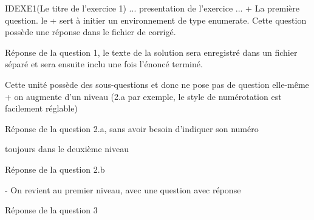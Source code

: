 \documentclass[11pt,report,oneside,solution]{cpgedev}
\begin{document}
\begin{latex}[]
\begin{exercice}{IDEXE1}(Le titre de l'exercice 1)
     ... presentation de l'exercice ...
\xques+ La première question. le + sert à initier un environnement de type enumerate. Cette question possède une réponse dans le fichier de corrigé.
\begin{solution}
     Réponse de la question 1, le texte de la solution sera enregistré dans un fichier séparé et sera ensuite inclu une fois l'énoncé terminé. 
\end{solution}
\zques Cette unité possède des sous-questions et donc ne pose pas 
de question elle-même
     \xques+ on augmente d'un niveau (2.a par exemple, le style de numérotation est facilement réglable)
     \begin{solution}
          Réponse de la question 2.a, sans avoir besoin d'indiquer son numéro 
     \end{solution}
     \xques toujours dans le deuxième niveau
     \begin{solution}
          Réponse de la question  2.b
     \end{solution}
\xques- On revient au premier niveau, avec une question avec réponse 
\begin{solution}
     Réponse de la question 3 
\end{solution}
\exit %
\end{exercice}
\end{latex} 
\end{document}
